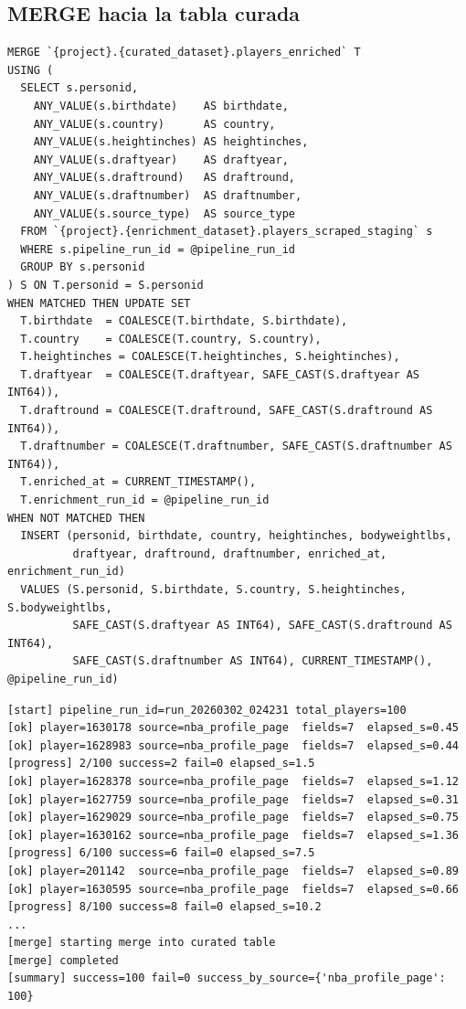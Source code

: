 \documentclass[12pt, letterpaper]{article}
\begin{document}
\subsection{MERGE hacia la tabla curada}

\begin{lstlisting}[style=codestyle, caption={Operación MERGE --- aplica valores scrapeados sin sobreescribir datos existentes}]
MERGE `{project}.{curated_dataset}.players_enriched` T
USING (
  SELECT s.personid,
    ANY_VALUE(s.birthdate)    AS birthdate,
    ANY_VALUE(s.country)      AS country,
    ANY_VALUE(s.heightinches) AS heightinches,
    ANY_VALUE(s.draftyear)    AS draftyear,
    ANY_VALUE(s.draftround)   AS draftround,
    ANY_VALUE(s.draftnumber)  AS draftnumber,
    ANY_VALUE(s.source_type)  AS source_type
  FROM `{project}.{enrichment_dataset}.players_scraped_staging` s
  WHERE s.pipeline_run_id = @pipeline_run_id
  GROUP BY s.personid
) S ON T.personid = S.personid
WHEN MATCHED THEN UPDATE SET
  T.birthdate  = COALESCE(T.birthdate, S.birthdate),
  T.country    = COALESCE(T.country, S.country),
  T.heightinches = COALESCE(T.heightinches, S.heightinches),
  T.draftyear  = COALESCE(T.draftyear, SAFE_CAST(S.draftyear AS INT64)),
  T.draftround = COALESCE(T.draftround, SAFE_CAST(S.draftround AS INT64)),
  T.draftnumber = COALESCE(T.draftnumber, SAFE_CAST(S.draftnumber AS INT64)),
  T.enriched_at = CURRENT_TIMESTAMP(),
  T.enrichment_run_id = @pipeline_run_id
WHEN NOT MATCHED THEN
  INSERT (personid, birthdate, country, heightinches, bodyweightlbs,
          draftyear, draftround, draftnumber, enriched_at, enrichment_run_id)
  VALUES (S.personid, S.birthdate, S.country, S.heightinches, S.bodyweightlbs,
          SAFE_CAST(S.draftyear AS INT64), SAFE_CAST(S.draftround AS INT64),
          SAFE_CAST(S.draftnumber AS INT64), CURRENT_TIMESTAMP(), @pipeline_run_id)
\end{lstlisting}

\begin{lstlisting}[style=outputstyle, caption={Evidencia --- log real de la ejecucion exitosa con \texttt{--skip-stats-api}}]
[start] pipeline_run_id=run_20260302_024231 total_players=100
[ok] player=1630178 source=nba_profile_page  fields=7  elapsed_s=0.45
[ok] player=1628983 source=nba_profile_page  fields=7  elapsed_s=0.44
[progress] 2/100 success=2 fail=0 elapsed_s=1.5
[ok] player=1628378 source=nba_profile_page  fields=7  elapsed_s=1.12
[ok] player=1627759 source=nba_profile_page  fields=7  elapsed_s=0.31
[ok] player=1629029 source=nba_profile_page  fields=7  elapsed_s=0.75
[ok] player=1630162 source=nba_profile_page  fields=7  elapsed_s=1.36
[progress] 6/100 success=6 fail=0 elapsed_s=7.5
[ok] player=201142  source=nba_profile_page  fields=7  elapsed_s=0.89
[ok] player=1630595 source=nba_profile_page  fields=7  elapsed_s=0.66
[progress] 8/100 success=8 fail=0 elapsed_s=10.2
...
[merge] starting merge into curated table
[merge] completed
[summary] success=100 fail=0 success_by_source={'nba_profile_page': 100}
\end{lstlisting}
\end{document}
